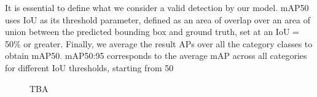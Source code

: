 \documentclass[10pt,twocolumn,letterpaper]{article}
\begin{document}
It is essential to define what we consider a valid detection by our model. mAP50 uses IoU as its threshold parameter, defined as an area of overlap over an area of union between the predicted bounding box and ground truth, set at an IoU = 50\% or greater. Finally, we average the result APs over all the category classes to obtain mAP50. mAP50:95 corresponds to the average mAP across all categories for different IoU thresholds, starting from 50%


\begin{figure}[h]
    \centering
    \qquad
    \caption{TBA}%
    \label{fig:example}
\end{figure}
\end{document}
